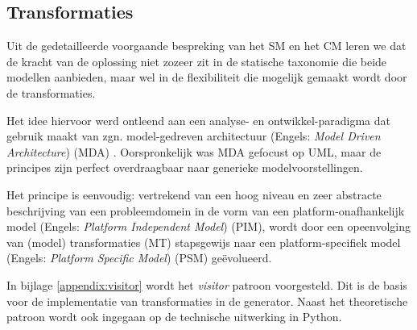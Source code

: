 
\subsection{Transformaties}
\label{subsection:devel-transformations}

Uit de gedetailleerde voorgaande bespreking van het SM en het CM leren we dat
de kracht van de oplossing niet zozeer zit in de statische taxonomie die beide
modellen aanbieden, maar wel in de flexibiliteit die mogelijk gemaakt wordt
door de transformaties.

Het idee hiervoor werd ontleend aan een analyse- en ontwikkel-paradigma dat
gebruik maakt van zgn. model-gedreven architectuur (Engels: \emph{Model Driven
Architecture}) (MDA) \citep{soley2000model,kleppe2003mda}. Oorspronkelijk was
MDA gefocust op UML, maar de principes zijn perfect overdraagbaar naar
generieke modelvoorstellingen.

Het principe is eenvoudig: vertrekend van een hoog niveau en zeer abstracte
beschrijving van een probleemdomein in de vorm van een platform-onafhankelijk
model (Engels: \emph{Platform Independent Model}) (PIM), wordt door een
opeenvolging van (model) transformaties (MT) stapsgewijs naar een
platform-specifiek model (Engels: \emph{Platform Specific Model}) (PSM)
ge\"evolueerd.

In bijlage \ref{appendix:visitor} wordt het \emph{visitor} patroon voorgesteld.
Dit is de basis voor de implementatie van transformaties in de generator. Naast
het theoretische patroon wordt ook ingegaan op de technische uitwerking in
Python.
